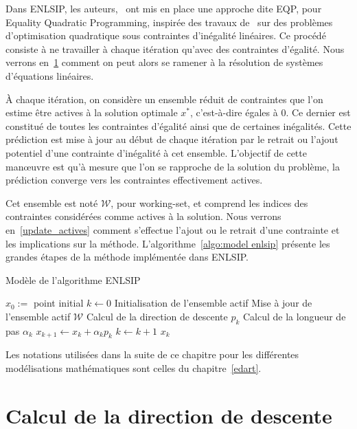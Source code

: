 Dans ENLSIP, les auteurs,~\citet{lindwedin88} ont mis en place une approche dite EQP, pour Equality Quadratic Programming, inspirée des travaux de~\citet{gillmurray1985}
sur des problèmes d'optimisation quadratique sous contraintes d'inégalité linéaires. Ce procédé consiste à ne travailler à chaque itération qu'avec des contraintes d'égalité.
Nous verrons en~\ref{direction_descente} comment on peut alors se ramener à la résolution de systèmes d'équations linéaires. 

\`A chaque itération, on considère un ensemble réduit de contraintes que l'on estime être actives à la solution optimale $x^*$, c'est-à-dire égales à $0$. Ce dernier est constitué de toutes les contraintes d'égalité
ainsi que de certaines inégalités. Cette prédiction est mise à jour au début de chaque itération par le retrait ou l'ajout potentiel d'une contrainte d'inégalité 
à cet ensemble. L'objectif de cette man\oe uvre est qu'à mesure que l'on se rapproche de la solution du problème, la prédiction converge vers les contraintes effectivement actives. 

Cet ensemble est noté $\mathcal{W}$, pour working-set, et comprend les indices des contraintes considérées comme actives à la solution. Nous verrons en~\ref{update_actives}
comment s'effectue l'ajout ou le retrait d'une contrainte et les implications sur la méthode. L'algorithme~\ref{algo:model enlsip} présente les grandes étapes de 
la méthode implémentée dans ENLSIP.

\begin{algorithm}
    \caption{Modèle de l'algorithme ENLSIP}
    \label{algo:model enlsip}
    \begin{algorithmic}
        \REQUIRE $x_0:=$ point initial
        \STATE $k\leftarrow 0$
        \STATE Initialisation de l'ensemble actif
        \REPEAT
        \STATE Mise à jour de l'ensemble actif $\mathcal{W}$
        \STATE Calcul de la direction de descente $p_k$
        \STATE Calcul de la longueur de pas $\alpha_k$
        \STATE $x_{k+1} \leftarrow x_k+\alpha_kp_k$
        \STATE $k \leftarrow k+1$
        \RETURN $x_k$
    \end{algorithmic}
\end{algorithm}

Les notations utilisées dans la suite de ce chapitre pour les différentes modélisations mathématiques sont celles du chapitre~\ref{edart}.

\section{Calcul de la direction de descente}\label{direction_descente}

